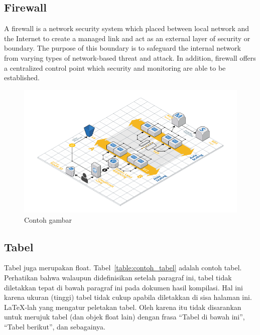 \documentclass[../index.tex]{subfiles}
\begin{document}
\subsection{Firewall}

A firewall is a network security system which placed between local network and the Internet to
create a managed link and act as an external layer of security or boundary. The purpose of this
boundary is to safeguard the internal network from varying types of network-based threat and attack.
In addition, firewall offers a centralized control point which security and monitoring are able to
be established.

\begin{figure}[h]
	\centering
	\includegraphics[width=\textwidth]{../assets/chapter-2-infrastructure-diagram.png}
	\caption{Contoh gambar}
	\label{fig:contoh_gambar}
\end{figure}

\subsection{Tabel}

Tabel juga merupakan float. Tabel~\ref{table:contoh_tabel} adalah contoh tabel. Perhatikan bahwa walaupun didefinisikan setelah paragraf ini, tabel tidak diletakkan tepat di bawah paragraf ini pada dokumen hasil kompilasi. Hal ini karena ukuran (tinggi) tabel tidak cukup apabila diletakkan di sisa halaman ini. \LaTeX-lah yang mengatur peletakan tabel. Oleh karena itu tidak disarankan untuk merujuk tabel (dan objek float lain) dengan frasa ``Tabel di bawah ini'', ``Tabel berikut'', dan sebagainya.
\end{document}
